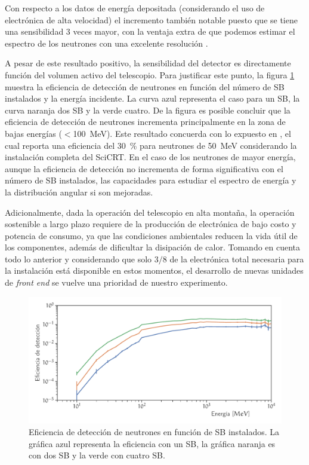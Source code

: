 Con respecto a los datos de energía depositada (considerando el uso de electrónica de alta velocidad) el incremento también notable puesto que se tiene una sensibilidad \num{3} veces mayor, con la ventaja extra de que podemos estimar el espectro de los neutrones con una excelente resolución \cite{ysasai17}.

A pesar de este resultado positivo, la sensibilidad del detector es directamente función del volumen activo del telescopio. Para justificar este punto, la figura \ref{fig:eficiencia-electronica} muestra la eficiencia de detección de neutrones en función del número de SB instalados y la energía incidente. La curva azul representa el caso para un SB, la curva naranja dos SB y la verde cuatro. De la figura es posible concluir que la eficiencia de detección de neutrones incrementa principalmente en la zona de bajas energías ($<$\SI{100}{\mega\electronvolt}). Este resultado concuerda con lo expuesto en \cite{nagaiphd}, el cual reporta una eficiencia del \SI{30}{\percent} para neutrones de \SI{50}{\mega\electronvolt} considerando la instalación completa del SciCRT. En el caso de los neutrones de mayor energía, aunque la eficiencia de detección no incrementa de forma significativa con el número de SB instalados, las capacidades para estudiar el espectro de energía y la distribución angular si son mejoradas.

Adicionalmente, dada la operación del telescopio en alta montaña, la operación sostenible a largo plazo requiere de la producción de electrónica de bajo costo y potencia de consumo, ya que las condiciones ambientales reducen la vida útil de los componentes, además de dificultar la disipación de calor. Tomando en cuenta todo lo anterior y considerando que solo $3/8$ de la electrónica total necesaria para la instalación está disponible en estos momentos, el desarrollo de nuevas unidades de \emph{front end} se vuelve una prioridad de nuestro experimento.

\begin{figure}
        \centering
        \includegraphics[width=\textwidth]{electronics-deff.pdf}
        \caption{Eficiencia de detección de neutrones en función de SB instalados. La gráfica azul representa la eficiencia con un SB, la gráfica naranja es con dos SB y la verde con cuatro SB.}
        \label{fig:eficiencia-electronica}
\end{figure}

